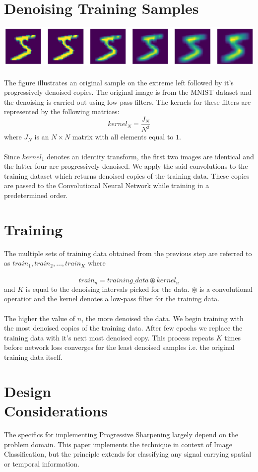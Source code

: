 \documentclass[12pt]{article}
\begin{document}
\begin{multicols}{2}
		\section{Denoising Training Samples}
		\includegraphics[width=\linewidth]{assets/denoise.png}
		\\\\
		The figure illustrates an original sample on the extreme left followed by it's progressively denoised copies. The original image is from the MNIST dataset and the denoising is carried out using low pass filters. The kernels for these filters are represented by the following matrices:
		$$ kernel_{N} = \frac{J_{N}}{N^2} $$
		where $J_{N}$ is an $N \times N$ matrix with all elements equal to $1$.
		\\\\
		Since $kernel_{1}$ denotes an identity transform, the first two images are identical and the latter four are progressively denoised. We apply the said convolutions to the training dataset which returns denoised copies of the training data. These copies are passed to the Convolutional Neural Network while training in a predetermined order.
		
		\section{Training}
		The multiple sets of training data obtained from the previous step are referred to as $train_{1},train_{2}, \hdots ,train_{K}$ where 
		\\\\
		$$train_{n} = training\_data \circledast kernel_{n} $$
		and $K$ is equal to the denoising intervals picked for the data. $\circledast$ is a convolutional operatior and the kernel denotes a low-pass filter for the training data. 
		\\\\
		The higher the value of $n$, the more denoised the data. We begin training with the most denoised copies of the training data. After few epochs we replace the training data with it's next most denoised copy. This process repeats $K$ times before network loss converges for the least denoised samples i.e. the original training data itself.
		
		\section{Design \\Considerations}
		The specifics for implementing Progressive Sharpening largely depend on the problem domain. This paper implements the technique in context of Image Classification, but the principle extends for classifying any signal carrying spatial or temporal information.

\end{multicols}
\end{document}
